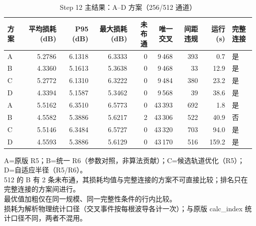 \begin{table}[htbp]
  \centering
  \caption{Step 12 主结果：A–D 方案（256/512 通道）}
  \label{tab:step12-main}
  \begin{tabular}{lrrrrrrrl}
    \toprule
    方案 & 平均损耗 (dB) & P95 (dB) & 最大损耗 (dB) & 未布通 & 唯一交叉 & 间距违规 & 运行 (s) & 完整连接 \\
    \midrule
    A & 5.2786 & 6.1318 & 6.3333 & 0 & 9\,468 & 393 & 0.7 & 是 \\
    B & 4.3360 & 5.1613 & 5.3638 & 0 & 9\,468 & 33 & 12.9 & 是 \\
    C & 5.2772 & 6.1310 & 6.3222 & 0 & 9\,484 & 380 & 23.2 & 是 \\
    D & 4.3394 & 5.1587 & 5.3462 & 0 & 9\,568 & 39 & 38.6 & 是 \\
    \midrule
    A & 5.5162 & 6.3510 & 6.5773 & 0 & 43\,393 & 692 & 1.8 & 是 \\
    B & 4.5582 & 5.3886 & 5.6217 & 2 & 43\,306 & 522 & 40.9 & 否 \\
    C & 5.5146 & 6.3484 & 6.5727 & 0 & 43\,320 & 703 & 94.0 & 是 \\
    D & 4.5593 & 5.3886 & 5.6129 & 0 & 43\,170 & 516 & 159.2 & 是 \\
    \bottomrule
  \end{tabular}
  \par\vspace{2pt}
  \begin{flushleft}\footnotesize
  A=原版 R5；B=统一 R6（参数对照，非算法贡献）；C=候选轨道优化（R5）；D=自适应半径（R5/R6）。 \\
  512 的 B 有 2 条未布通，其损耗均值与完整连接的方案不可直接比较；排名只在完整连接的方案间进行。 \\
  最优值加粗仅在同一规模、同一完整性条件的行内比较。 \\
  损耗为解析物理统计口径（交叉事件按每根波导各计一次）；与原版 calc\_index 统计口径不同，两者不混用。 \\
  \end{flushleft}
\end{table}
